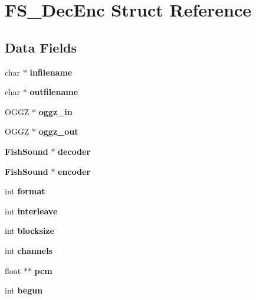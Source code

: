 \section{\-F\-S\-\_\-\-Dec\-Enc \-Struct \-Reference}
\label{structFS__DecEnc}
\subsection*{\-Data \-Fields}
\begin{DoxyCompactItemize}
\item 
char $\ast$ {\bfseries infilename}\label{structFS__DecEnc_a2d504fd84cb7ed0e37f8426d54604bc6}

\item 
char $\ast$ {\bfseries outfilename}\label{structFS__DecEnc_a8c5d866d2d7eae7b06284a7eb090872a}

\item 
\-O\-G\-G\-Z $\ast$ {\bfseries oggz\-\_\-in}\label{structFS__DecEnc_ab2c10caaf9504ca316f961227035a65f}

\item 
\-O\-G\-G\-Z $\ast$ {\bfseries oggz\-\_\-out}\label{structFS__DecEnc_ac67d216f68cd4b5b8047f4bfbca59954}

\item 
{\bf \-Fish\-Sound} $\ast$ {\bfseries decoder}\label{structFS__DecEnc_a4110f95fd7bd1d525240340c56d5edba}

\item 
{\bf \-Fish\-Sound} $\ast$ {\bfseries encoder}\label{structFS__DecEnc_a45453cc1286e459865881ca52fb50b72}

\item 
int {\bfseries format}\label{structFS__DecEnc_a5cf3da44e41bc3e5a1a06613cc47f5d2}

\item 
int {\bfseries interleave}\label{structFS__DecEnc_ac0659a7bb25d60473ca9192508abc1a0}

\item 
int {\bfseries blocksize}\label{structFS__DecEnc_afd37425c29c3b12cccf0d03d248dd27e}

\item 
int {\bfseries channels}\label{structFS__DecEnc_a33cc7d9c2cf0eb60d508b2201243729d}

\item 
float $\ast$$\ast$ {\bfseries pcm}\label{structFS__DecEnc_acd8b8ef826db6fd6ec2a9f9fb4f2a42c}

\item 
int {\bfseries begun}\label{structFS__DecEnc_a206983f5ec9f76a6948ee2de26f9de8d}


\end{DoxyCompactItemize}
